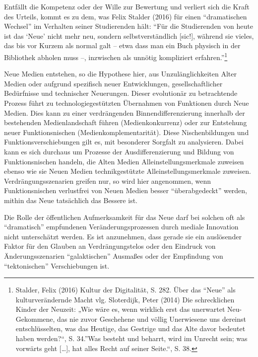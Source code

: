 \documentclass[a4paper,
fontsize=11pt,
oneside,
numbers=noperiodatend,
parskip=half-,
bibliography=totoc,
final
]{scrartcl}
\begin{document}
Entfällt die Kompetenz oder der Wille zur Bewertung und verliert sich
die Kraft des Urteils, kommt es zu dem, was Felix Stalder (2016) für
einen \enquote{dramatischen Wechsel} im Verhalten seiner Studierenden
hält: \enquote{Für die Studierenden von heute ist das \enquote{Neue}
nicht mehr neu, sondern selbstverständlich {[}sic!{]}, während sie
vieles, das bis vor Kurzem als normal galt -- etwa dass man ein Buch
physisch in der Bibliothek abholen muss --, inzwischen als unnötig
kompliziert erfahren.}\footnote{Stalder, Felix (2016) Kultur der
  Digitalität, S. 282. Über das \enquote{Neue} als kulturverändernde
  Macht vlg. Sloterdijk, Peter (2014) Die schrecklichen Kinder der
  Neuzeit: „Wie wäre es, wenn wirklich erst das unerwartet
  Neu-Gekommene, das nie zuvor Geschehene und völlig Unerwiesene uns
  dereinst entschlüsselten, was das Heutige, das Gestrige und das Alte
  davor bedeutet haben werden?\enquote{, S. 34.}Was besteht und beharrt,
  wird im Unrecht sein; was vorwärts geht {[}\ldots{}{]}, hat alles
  Recht auf seiner Seite.``, S. 38.}

Neue Medien entstehen, so die Hypothese hier, aus Unzulänglichkeiten
Alter Medien oder aufgrund spezifisch neuer Entwicklungen,
gesellschaftlicher Bedürfnisse und technischer Neuerungen. Dieser
evolutionär zu betrachtende Prozess führt zu technologiegestützten
Übernahmen von Funktionen durch Neue Medien. Dies kann zu einer
verdrängenden Binnendifferenzierung innerhalb der bestehenden
Medienlandschaft führen (Medienkonkurrenz) oder zur Entstehung neuer
Funktionsnischen (Medienkomplementarität). Diese Nischenbildungen und
Funktionsverschiebungen gilt es, mit besonderer Sorgfalt zu analysieren.
Dabei kann es sich durchaus um Prozesse der Ausdifferenzierung und
Bildung von Funktionsnischen handeln, die Alten Medien
Alleinstellungsmerkmale zuweisen ebenso wie sie Neuen Medien
technikgestützte Alleinstellungsmerkmale zuweisen. Verdrängungsszenarien
greifen nur, so wird hier angenommen, wenn Funktionsnischen verlustfrei
von Neuen Medien besser \enquote{überabgedeckt} werden, mithin das Neue
tatsächlich das Bessere ist.

Die Rolle der öffentlichen Aufmerksamkeit für das Neue darf bei solchen
oft als \enquote{dramatisch} empfundenen Veränderungsprozessen durch
mediale Innovation nicht unterschätzt werden. Es ist anzunehmen, dass
gerade sie ein auslösender Faktor für den Glauben an Verdrängungstelos
oder den Eindruck von Änderungsszenarien \enquote{galaktischen} Ausmaßes
oder der Empfindung von \enquote{tektonischen} Verschiebungen ist.
\end{document}
